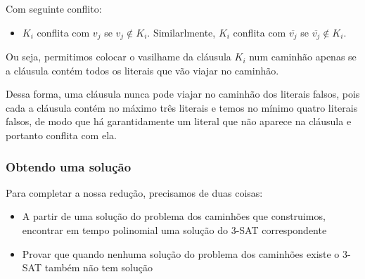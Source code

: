 \documentclass[11pt]{article}
\begin{document}
Com seguinte conflito:

\begin{itemize}
\item $K_i$ conflita com $v_j$ se $v_j \not\in K_i$. Similarlmente, $K_i$
  conflita com $\overline{v_j}$ se $\overline{v_j} \not\in K_i$.
\end{itemize}

Ou seja, permitimos colocar o vasilhame da cláusula $K_i$ num caminhão
apenas se a cláusula contém todos os literais que vão viajar no
caminhão.

Dessa forma, uma cláusula nunca pode viajar no caminhão dos literais
falsos, pois cada a cláusula contém no máximo três literais e temos no
mínimo quatro literais falsos, de modo que há garantidamente um
literal que não aparece na cláusula e portanto conflita com ela.

\subsubsection{Obtendo uma solução}
\label{sec-3-3-2}

Para completar a nossa redução, precisamos de duas coisas:
\begin{itemize}
\item A partir de uma solução do problema dos caminhões que construimos,
encontrar em tempo polinomial uma solução do 3-SAT correspondente
\item Provar que quando nenhuma solução do problema dos caminhões existe o
3-SAT também não tem solução
\end{itemize}
\end{document}

